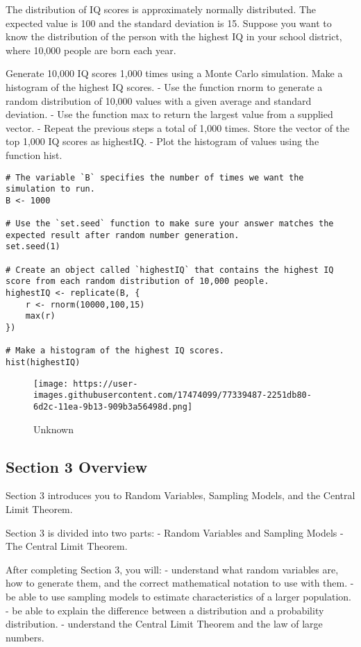 \documentclass[
]{article}
\begin{document}
The distribution of IQ scores is approximately normally distributed. The
expected value is 100 and the standard deviation is 15. Suppose you want
to know the distribution of the person with the highest IQ in your
school district, where 10,000 people are born each year.

Generate 10,000 IQ scores 1,000 times using a Monte Carlo simulation.
Make a histogram of the highest IQ scores. - Use the function rnorm to
generate a random distribution of 10,000 values with a given average and
standard deviation. - Use the function max to return the largest value
from a supplied vector. - Repeat the previous steps a total of 1,000
times. Store the vector of the top 1,000 IQ scores as highestIQ. - Plot
the histogram of values using the function hist.

\begin{verbatim}
# The variable `B` specifies the number of times we want the simulation to run.
B <- 1000

# Use the `set.seed` function to make sure your answer matches the expected result after random number generation.
set.seed(1)

# Create an object called `highestIQ` that contains the highest IQ score from each random distribution of 10,000 people.
highestIQ <- replicate(B, {
    r <- rnorm(10000,100,15)
    max(r)
})

# Make a histogram of the highest IQ scores.
hist(highestIQ)
\end{verbatim}

\begin{figure}
\centering
\texttt{[image: https://user-images.githubusercontent.com/17474099/77339487-2251db80-6d2c-11ea-9b13-909b3a56498d.png]}
\caption{Unknown}
\end{figure}

\hypertarget{section-3-overview}{%
\subsection{Section 3 Overview}\label{section-3-overview}}

Section 3 introduces you to Random Variables, Sampling Models, and the
Central Limit Theorem.

Section 3 is divided into two parts: - Random Variables and Sampling
Models - The Central Limit Theorem.

After completing Section 3, you will: - understand what random variables
are, how to generate them, and the correct mathematical notation to use
with them. - be able to use sampling models to estimate characteristics
of a larger population. - be able to explain the difference between a
distribution and a probability distribution. - understand the Central
Limit Theorem and the law of large numbers.
\end{document}
